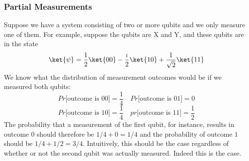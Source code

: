 \documentclass[12pt, oneside]{book}
\theoremstyle{definition}
\theoremstyle{definition}
\theoremstyle{remark}
\begin{document}
\subsubsection{Partial Measurements}
Suppose we have a system consisting of two or more qubits and we only measure one of them. For
example, suppose the qubits are X and Y, and these qubits are in the state
\[
\ket{\psi}=\frac{1}{2}\ket{00}-\frac{\iota}{2}\ket{10}+\frac{1}{\sqrt{2}}\ket{11}
\]
We know what the distribution of measurement outcomes would be if we measured both qubits:
\[
Pr\text{[outcome is 00]} = \frac{1}{4} \quad Pr\text{[outcome is 01]}=0
\]
\[
Pr\text{[outcome is 10]}=\frac{1}{4} \quad pr\text{[outcome is 11]}=\frac{1}{2}
\]
The probability that a measurement of the first qubit, for instance, results in outcome $0$ should
therefore be $1/4+0 = 1/4$ and the probability of outcome $1$ should be $1/4+1/2 = 3/4$. Intuitively,
this should be the case regardless of whether or not the second qubit was actually measured. Indeed
this is the case.
\end{document}
